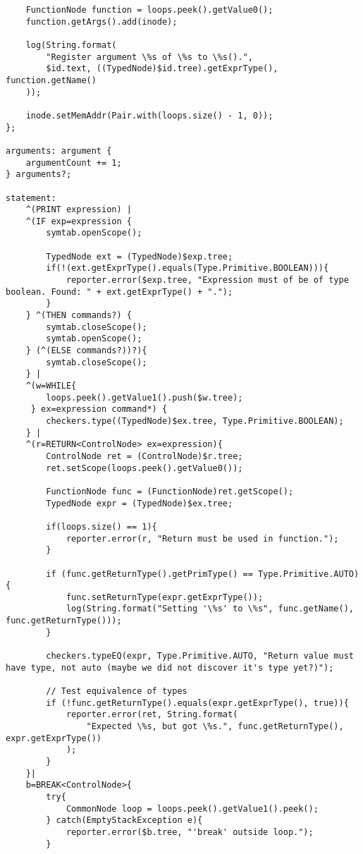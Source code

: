 \begin{landscape}
\begin{lstlisting}
    FunctionNode function = loops.peek().getValue0();
    function.getArgs().add(inode);

    log(String.format(
        "Register argument \%s of \%s to \%s().",
        $id.text, ((TypedNode)$id.tree).getExprType(), function.getName()
    ));

    inode.setMemAddr(Pair.with(loops.size() - 1, 0));
};

arguments: argument {
    argumentCount += 1;
} arguments?;

statement:
    ^(PRINT expression) |
    ^(IF exp=expression {
        symtab.openScope();

        TypedNode ext = (TypedNode)$exp.tree;
        if(!(ext.getExprType().equals(Type.Primitive.BOOLEAN))){
            reporter.error($exp.tree, "Expression must of be of type boolean. Found: " + ext.getExprType() + ".");
        }
    } ^(THEN commands?) {
        symtab.closeScope();
        symtab.openScope();
    } (^(ELSE commands?))?){
        symtab.closeScope();
    } |
    ^(w=WHILE{
        loops.peek().getValue1().push($w.tree);
     } ex=expression command*) {
        checkers.type((TypedNode)$ex.tree, Type.Primitive.BOOLEAN);
    } |
    ^(r=RETURN<ControlNode> ex=expression){
        ControlNode ret = (ControlNode)$r.tree;
        ret.setScope(loops.peek().getValue0());

        FunctionNode func = (FunctionNode)ret.getScope();
        TypedNode expr = (TypedNode)$ex.tree;

        if(loops.size() == 1){
            reporter.error(r, "Return must be used in function.");
        }

        if (func.getReturnType().getPrimType() == Type.Primitive.AUTO){
            func.setReturnType(expr.getExprType());
            log(String.format("Setting '\%s' to \%s", func.getName(), func.getReturnType()));
        }

        checkers.typeEQ(expr, Type.Primitive.AUTO, "Return value must have type, not auto (maybe we did not discover it's type yet?)");

        // Test equivalence of types
        if (!func.getReturnType().equals(expr.getExprType(), true)){
            reporter.error(ret, String.format(
                "Expected \%s, but got \%s.", func.getReturnType(), expr.getExprType())
            );
        }
    }|
    b=BREAK<ControlNode>{
        try{
            CommonNode loop = loops.peek().getValue1().peek();
        } catch(EmptyStackException e){
            reporter.error($b.tree, "'break' outside loop.");
        }


\end{lstlisting}
\end{landscape}
